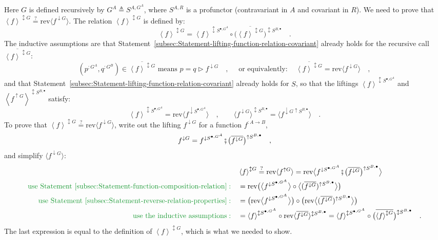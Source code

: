 Here $G$ is defined recursively by $G^{A}\triangleq S^{A,G^{A}}$,
where $S^{A,R}$ is a profunctor (contravariant in $A$ and covariant
in $R$). We need to prove that $\left<f\right>^{\updownarrow G}\overset{?}{=}\text{rev}\langle f^{\downarrow G}\rangle$.
The relation $\left<f\right>^{\updownarrow G}$ is defined by:
\[
\left<f\right>^{\updownarrow G}=\left<f\right>^{\updownarrow S^{\bullet,G^{A}}}\circ\big(\overline{\left<f\right>^{\updownarrow G}}\big)^{\updownarrow S^{B,\bullet}}\quad.
\]
The inductive assumptions are that Statement~\ref{subsec:Statement-lifting-function-relation-covariant}
already holds for the recursive call $\overline{\left<f\right>^{\updownarrow G}}$:
\[
(p^{:G^{A}},q^{:G^{B}})\in\overline{\left<f\right>^{\updownarrow G}}\text{ means }p=q\triangleright f^{\downarrow G}\quad,\quad\text{ or equivalently}:\quad\overline{\left<f\right>^{\updownarrow G}}=\text{rev}\langle f^{\downarrow G}\rangle\quad,
\]
and that Statement~\ref{subsec:Statement-lifting-function-relation-covariant}
already holds for $S$, so that the liftings $\left<f\right>^{\updownarrow S^{\bullet,G^{A}}}$
and $\left<f^{\uparrow G}\right>^{\updownarrow S^{B,\bullet}}$ satisfy:
\[
\left<f\right>^{\updownarrow S^{\bullet,G^{A}}}=\text{rev}\langle f^{\downarrow S^{\bullet,G^{A}}}\rangle\quad,\quad\quad\langle f^{\downarrow G}\rangle^{\updownarrow S^{B,\bullet}}=\langle f^{\downarrow G\uparrow S^{B,\bullet}}\rangle\quad.
\]
To prove that $\left<f\right>^{\updownarrow G}\overset{?}{=}\text{rev}\langle f^{\downarrow G}\rangle$,
write out the lifting $f^{\downarrow G}$ for a function $f^{:A\rightarrow B}$,
\[
f^{\downarrow G}=f^{\downarrow S^{\bullet,G^{A}}}\bef\big(\overline{f^{\downarrow G}}\big)^{\uparrow S^{B,\bullet}}\quad,
\]
and simplify $\langle f^{\downarrow G}\rangle$:
\begin{align*}
 & \left<f\right>^{\updownarrow G}\overset{?}{=}\text{rev}\langle f^{\uparrow G}\rangle=\text{rev}\big\langle f^{\downarrow S^{\bullet,G^{A}}}\bef\big(\overline{f^{\downarrow G}}\big)^{\uparrow S^{B,\bullet}}\big\rangle\\
{\color{greenunder}\text{use Statement~\ref{subsec:Statement-function-composition-relation}}:}\quad & =\text{rev}\big(\big\langle f^{\downarrow S^{\bullet,G^{A}}}\big\rangle\circ\big\langle(\overline{f^{\downarrow G}})^{\uparrow S^{B,\bullet}}\big\rangle\big)\\
{\color{greenunder}\text{use Statement~\ref{subsec:Statement-reverse-relation-properties}}:}\quad & =\big(\text{rev}\big\langle f^{\downarrow S^{\bullet,G^{A}}}\big\rangle\big)\circ\big(\text{rev}\big\langle(\overline{f^{\downarrow G}})^{\uparrow S^{B,\bullet}}\big\rangle\big)\\
{\color{greenunder}\text{use the inductive assumptions}:}\quad & =\left<f\right>^{\updownarrow S^{\bullet,G^{A}}}\circ\text{rev}\langle\overline{f^{\downarrow G}}\rangle^{\updownarrow S^{B,\bullet}}=\left<f\right>^{\updownarrow S^{\bullet,G^{A}}}\circ\big(\overline{\left<f\right>^{\updownarrow G}}\big)^{\updownarrow S^{B,\bullet}}\quad.
\end{align*}
The last expression is equal to the definition of $\left<f\right>^{\updownarrow G}$,
which is what we needed to show.

